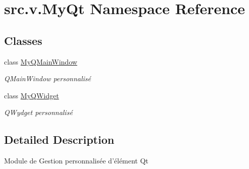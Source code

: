 \hypertarget{namespacesrc_1_1v_1_1_my_qt}{}\section{src.\+v.\+My\+Qt Namespace Reference}
\label{namespacesrc_1_1v_1_1_my_qt}
\subsection*{Classes}
\begin{DoxyCompactItemize}
\item 
class \hyperlink{classsrc_1_1v_1_1_my_qt_1_1_my_q_main_window}{My\+Q\+Main\+Window}
\begin{DoxyCompactList}\small\item\em Q\+Main\+Window personnalisé \end{DoxyCompactList}\item 
class \hyperlink{classsrc_1_1v_1_1_my_qt_1_1_my_q_widget}{My\+Q\+Widget}
\begin{DoxyCompactList}\small\item\em Q\+Wydget personnalisé \end{DoxyCompactList}\end{DoxyCompactItemize}


\subsection{Detailed Description}
\begin{DoxyVerb}    Module de Gestion personnalisée d'élément Qt
\end{DoxyVerb}
 